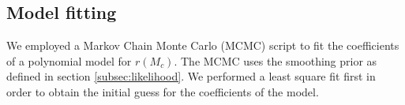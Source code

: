 \subsection{Model fitting}
\label{subsec:fitting}
We employed a Markov Chain Monte Carlo (MCMC) script to fit the coefficients of a polynomial model for $r(M_c)$. The MCMC uses the smoothing prior as defined in section \ref{subsec:likelihood}. We performed a least square fit first in order to obtain the initial guess for the coefficients of the model.